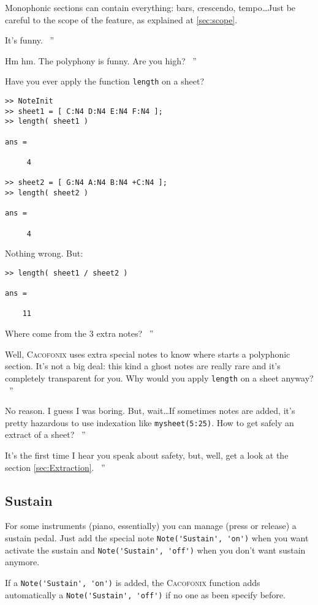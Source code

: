 \documentclass{article}
\newcommand{\cacofonix}{\textsc{Cacofonix}\xspace}
\newenvironment{meenv}{ \par \noindent \makebox[6em][r]{ \textcolor{mecolor}{Me}: `` --~}}{~''}
\newenvironment{myselfenv}{ \par \noindent \makebox[6em][r]{ \textcolor{myselfcolor}{Myself}: `` --~}}{~''}
\newcommand{ \me }[1]{%
\begin{meenv}%
	#1%
\end{meenv} }
\newcommand{ \myself }[1]{%
\begin{myselfenv}%
	#1%
\end{myselfenv} }
\begin{document}
Monophonic sections can contain everything: bars, crescendo, tempo\dots Just be careful to the scope of the feature, as explained at \ref{sec:scope}.

\me{It's funny.}
\myself{Hm hm. The polyphony is funny. Are you high?}
\begin{meenv}%
Have you ever apply the function \lstinline!length! on a sheet?
\begin{lstlisting}
>> NoteInit
>> sheet1 = [ C:N4 D:N4 E:N4 F:N4 ];
>> length( sheet1 )

ans =

     4

>> sheet2 = [ G:N4 A:N4 B:N4 +C:N4 ];
>> length( sheet2 )

ans =

     4

\end{lstlisting}
Nothing wrong. But:
\begin{lstlisting}
>> length( sheet1 / sheet2 )

ans =

    11

\end{lstlisting}
Where come from the $3$ extra notes?%
\end{meenv}
\myself{Well, \cacofonix uses extra special notes to know where starts a polyphonic section. It's not a big deal: this kind a ghost notes are really rare and it's completely transparent for you. Why would you apply \lstinline!length! on a sheet anyway?}
\begin{meenv}%
No reason. I guess I was boring. But, wait\dots If sometimes notes are added, it's pretty hazardous to use indexation like \lstinline!mysheet(5:25)!. How to get safely an extract of a sheet?%
\end{meenv}
\myself{It's the first time I hear you speak about safety, but, well, get a look at the section \ref{sec:Extraction}.} 

\subsection{Sustain}
\label{sec:Sustain}

For some instruments (piano, essentially) you can manage (press or release) a sustain pedal. Just add the special note \lstinline!Note('Sustain', 'on')! when you want activate the sustain and \lstinline!Note('Sustain', 'off')! when you don't want sustain anymore.

If a \lstinline!Note('Sustain', 'on')! is added, the \cacofonix function adds automatically a \lstinline!Note('Sustain', 'off')! if no one as been specify before.
\end{document}
